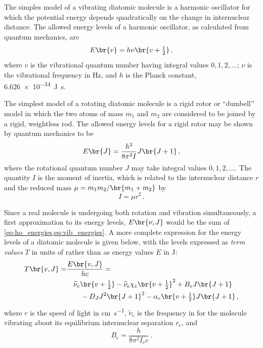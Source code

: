 \documentclass[nobib,nofonts,nols,nohyper]{tufte-handout}
\begin{document}
The simples model of a vibrating diatomic molecule is a harmonic oscillator for which the potential energy depends quadratically on the change in internuclear distance. 
The allowed energy levels of a harmonic oscillator, as calculated from quantum mechanics\autocite{atkins94}, are
\begin{equation}
	E\br{v} = h \nu \br{v + \tfrac{1}{2}} \, ,
	\label{eq:ho_energies}
\end{equation}
where \( v \) is the vibrational quantum number having integral values \( 0, 1, 2, \ldots \); \( \nu \) is the vibrational frequency in \si{\Hz}, and \( h \) is the Planck constant, \SI{6.626e-34}{\J\s}. 

The simplest model of a rotating diatomic molecule is a rigid rotor or ``dumbell'' model in which the two atoms of mass \( m_1 \) and \( m_2 \) are considered to be joined by a rigid, weightless rod. 
The allowed energy levels for a rigid rotor may be shown by quantum mechanics\autocite{atkins94} to be
\begin{equation}
	E\br{J} = \frac{h^2}{8 \pi^2 I} J \br{J + 1} \, ,
	\label{eq:vib_energies}
\end{equation}
where the rotational quantum number \( J \) may take integral values \( 0, 1, 2, \ldots \). 
The quantity \( I \) is the moment of inertia, which is related to the internuclear distance \( r \) and the reduced mass \( \mu = m_1 m_2 / \br{m_1 + m_2} \) by
\begin{equation}
	I = \mu r^2 \, .
	\label{eq:mom_of_intert}
\end{equation}

Since a real molecule is undergoing both rotation and vibration simultaneously, a first approximation to its energy levels, \( E\br{\nu, J} \) would be the sum of \cref{eq:ho_energies,eq:vib_energies}. 
A more complete expression for the energy levels of a diatomic molecule\autocite{herzberg89,kerr82} is given below, with the levels expressed as \emph{term values} \( T \) in units of \si{\wn} rather than as energy values \( E \) in \si{\J}:
\begin{equation}
	\begin{aligned}
	T\br{v, J} =& \frac{E\br{v, J}}{h c} = \\
		& \quad \widetilde{\nu}_e\br{v + \tfrac{1}{2}} - \widetilde{\nu}_e \chi_e\br{v + \tfrac{1}{2}}^2 + B_e J \br{J + 1} \\
			& \qquad - D_J J^2 \br{J + 1}^2 - \alpha_e \br{v + \tfrac{1}{2}} J \br{J + 1} \, ,
	\end{aligned}
	\label{eq:vib_rot_energies}
\end{equation}
where \( c \) is the speed of light in \si{\cm \per \s}, \( \widetilde{\nu}_e \) is the frequency in \si{\wn} for the molecule vibrating about its equilibrium internuclear separation \( r_e \), and 
\begin{equation}
	B_e = \frac{h}{8 \pi^2 I_e c} \, .
	\label{eq:b_e}
\end{equation}
\end{document}
